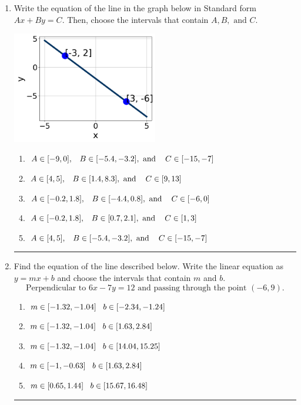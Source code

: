 \documentclass[14pt]{extbook}
\newcommand{\litem}[1]{\item#1\hspace*{-1cm}\rule{\textwidth}{0.4pt}}
\begin{document}
\begin{enumerate}
\litem{
Write the equation of the line in the graph below in Standard form $Ax+By=C$. Then, choose the intervals that contain $A, B, \text{ and } C$.
\begin{center}
    \includegraphics[width=0.5\textwidth]{../Figures/linearGraphToStandardA.png}
\end{center}
\begin{enumerate}[label=\Alph*.]
\item \( A \in [-9, 0], \hspace{3mm} B \in [-5.4, -3.2], \text{ and } \hspace{3mm} C \in [-15, -7] \)
\item \( A \in [4, 5], \hspace{3mm} B \in [1.4, 8.3], \text{ and } \hspace{3mm} C \in [9, 13] \)
\item \( A \in [-0.2, 1.8], \hspace{3mm} B \in [-4.4, 0.8], \text{ and } \hspace{3mm} C \in [-6, 0] \)
\item \( A \in [-0.2, 1.8], \hspace{3mm} B \in [0.7, 2.1], \text{ and } \hspace{3mm} C \in [1, 3] \)
\item \( A \in [4, 5], \hspace{3mm} B \in [-5.4, -3.2], \text{ and } \hspace{3mm} C \in [-15, -7] \)

\end{enumerate} }
\litem{
Find the equation of the line described below. Write the linear equation as $ y=mx+b $ and choose the intervals that contain $m$ and $b$.\[ \text{Perpendicular to } 6 x - 7 y = 12 \text{ and passing through the point } (-6, 9). \]\begin{enumerate}[label=\Alph*.]
\item \( m \in [-1.32, -1.04] \hspace*{3mm} b \in [-2.34, -1.24] \)
\item \( m \in [-1.32, -1.04] \hspace*{3mm} b \in [1.63, 2.84] \)
\item \( m \in [-1.32, -1.04] \hspace*{3mm} b \in [14.04, 15.25] \)
\item \( m \in [-1, -0.63] \hspace*{3mm} b \in [1.63, 2.84] \)
\item \( m \in [0.65, 1.44] \hspace*{3mm} b \in [15.67, 16.48] \)


\end{enumerate}}
\end{enumerate}
\end{document}
